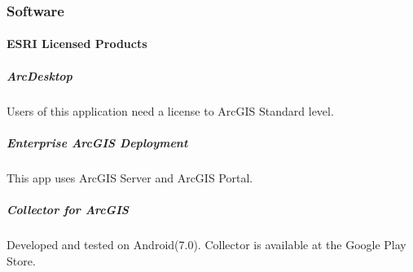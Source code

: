 \documentclass[class=article , crop=false, titlepage, twoside, multi={itemize, figure, verbatim}, float=false]{standalone}
\begin{document}
\clearpage
\subsubsection{Software}
\paragraph{ESRI Licensed Products}
\subparagraph{ArcDesktop}Users of this application need a license to ArcGIS Standard level.

\subparagraph{Enterprise ArcGIS Deployment}This app uses ArcGIS Server and ArcGIS Portal.

\subparagraph{Collector for ArcGIS}Developed and tested on Android(7.0).  Collector is available at the Google Play Store.
\end{document}
